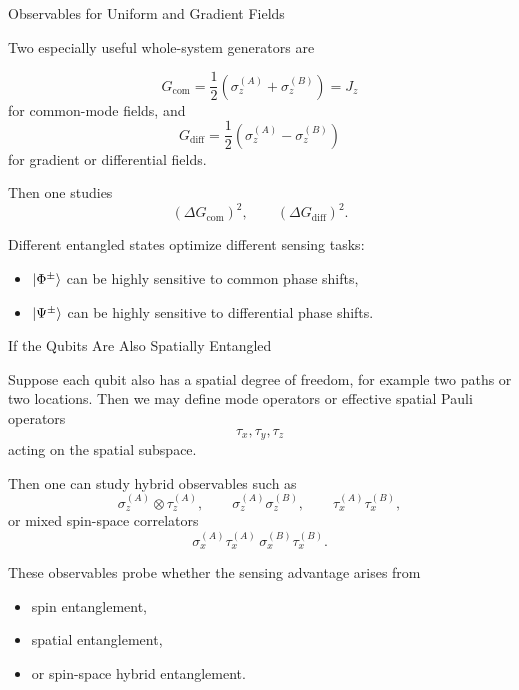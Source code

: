 \documentclass{beamer}
\begin{document}
\begin{frame}{Observables for Uniform and Gradient Fields}

Two especially useful whole-system generators are

\[
G_{\mathrm{com}} = \frac{1}{2}\left(\sigma_z^{(A)}+\sigma_z^{(B)}\right)=J_z
\]
for common-mode fields, and
\[
G_{\mathrm{diff}} = \frac{1}{2}\left(\sigma_z^{(A)}-\sigma_z^{(B)}\right)
\]
for gradient or differential fields.

Then one studies
\[
(\Delta G_{\mathrm{com}})^2,\qquad
(\Delta G_{\mathrm{diff}})^2.
\]

Different entangled states optimize different sensing tasks:
\begin{itemize}
    \item $\ket{\Phi^\pm}$ can be highly sensitive to common phase shifts,
    \item $\ket{\Psi^\pm}$ can be highly sensitive to differential phase shifts.
\end{itemize}

\end{frame}

\begin{frame}{If the Qubits Are Also Spatially Entangled}

Suppose each qubit also has a spatial degree of freedom, for example
two paths or two locations.
Then we may define mode operators or effective spatial Pauli operators
\[
\tau_x,\tau_y,\tau_z
\]
acting on the spatial subspace.

Then one can study hybrid observables such as
\[
\sigma_z^{(A)}\otimes \tau_z^{(A)},\qquad
\sigma_z^{(A)}\sigma_z^{(B)},\qquad
\tau_x^{(A)}\tau_x^{(B)},
\]
or mixed spin-space correlators
\[
\sigma_x^{(A)}\tau_x^{(A)}\,\sigma_x^{(B)}\tau_x^{(B)}.
\]

These observables probe whether the sensing advantage arises from
\begin{itemize}
    \item spin entanglement,
    \item spatial entanglement,
    \item or spin-space hybrid entanglement.
\end{itemize}

\end{frame}
\end{document}
